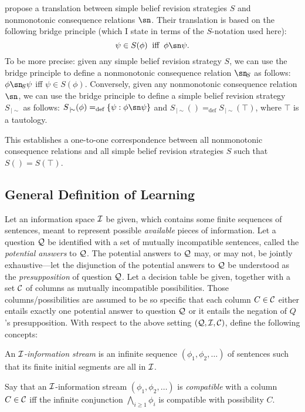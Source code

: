 \citet*{makinson1991relations} propose a translation between simple belief revision strategies $S$ and nonmonotonic consequence relations $\sn$. Their translation is based on the following bridge principle (which I state in terms of the $S$-notation used here): 
	$$\psi \in S(\phi) \;\;\text{iff}\;\; \phi \sn \psi.$$ 
To be more precise: given any simple belief revision strategy $S$, we can use the bridge principle to define a nonmonotonic consequence relation $\sn_{\!S}$ as follows: $\phi \sn_{\!S} \psi$ iff $\psi \in S(\phi)$. Conversely, given any nonmonotonic consequence relation $\sn$, we can use the bridge principle to define a simple belief revision strategy $S_{\,|\!\sim}$ as follows: $S_{\,|\!\sim}(\phi) =_\text{def} \{\psi: \phi \sn \psi\}$ and $S_{\,|\!\sim}() =_\text{def} S_{\,|\!\sim}(\top)$, where $\top$ is a tautology. 

This establishes a one-to-one correspondence between all nonmonotonic consequence relations and all simple belief revision strategies $S$ such that $S() = S(\top)$.

\subsection{General Definition of Learning}\label{app-learning}

Let an information space $\cal I$ be given, which contains some finite sequences of sentences, meant to represent possible {\em available} pieces of information. Let a question $\cal Q$ be identified with a set of mutually incompatible sentences, called the {\em potential answers} to $\cal Q$. The potential answers to $\cal Q$ may, or may not, be jointly exhaustive---let the disjunction of the potential answers to $\cal Q$ be understood as the {\em presupposition} of question $\cal Q$. Let a decision table be given, together with a set ${\cal C}$ of columns as mutually incompatible possibilities. Those columns/possibilities are assumed to be so specific that each column $C \in {\cal C}$ either entails exactly one potential answer to question $\cal Q$ or it entails the negation of $Q$'s presupposition. With respect to the above setting $({\cal Q}, {\cal I}, {\cal C})$, define the following concepts: \op

	\im An {\em $\cal I$-information stream} is an infinite sequence $(\phi_1, \phi_2, \ldots)$ of sentences such that its finite initial segments are all in $\cal I$.
	
	\im Say that an $\cal I$-information stream $(\phi_1, \phi_2, \ldots)$ is {\em compatible} with a column $C \in {\cal C}$ iff the infinite conjunction $\bigwedge_{i \ge 1} \phi_i$ is compatible with possibility $C$.
	
